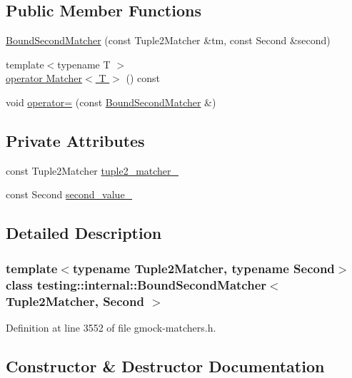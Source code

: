 \subsection*{Public Member Functions}
\begin{DoxyCompactItemize}
\item 
\hyperlink{classtesting_1_1internal_1_1BoundSecondMatcher_af9d0d4b50a3b9883ff26312922b9f639}{Bound\+Second\+Matcher} (const Tuple2\+Matcher \&tm, const Second \&second)
\item 
{\footnotesize template$<$typename T $>$ }\\\hyperlink{classtesting_1_1internal_1_1BoundSecondMatcher_abc5264ca86c2440b663036dcfb5403de}{operator Matcher$<$ T $>$} () const
\item 
void \hyperlink{classtesting_1_1internal_1_1BoundSecondMatcher_a62f714cb2c7388cb582aaae0110bfe49}{operator=} (const \hyperlink{classtesting_1_1internal_1_1BoundSecondMatcher}{Bound\+Second\+Matcher} \&)
\end{DoxyCompactItemize}
\subsection*{Private Attributes}
\begin{DoxyCompactItemize}
\item 
const Tuple2\+Matcher \hyperlink{classtesting_1_1internal_1_1BoundSecondMatcher_a4e73978cc5f6972a37b01832380f099e}{tuple2\+\_\+matcher\+\_\+}
\item 
const Second \hyperlink{classtesting_1_1internal_1_1BoundSecondMatcher_a5b0de81ac5ff6e7d9e21cb8bfeaacaf5}{second\+\_\+value\+\_\+}
\end{DoxyCompactItemize}


\subsection{Detailed Description}
\subsubsection*{template$<$typename Tuple2\+Matcher, typename Second$>$\newline
class testing\+::internal\+::\+Bound\+Second\+Matcher$<$ Tuple2\+Matcher, Second $>$}



Definition at line 3552 of file gmock-\/matchers.\+h.



\subsection{Constructor \& Destructor Documentation}
\mbox{\label{classtesting_1_1internal_1_1BoundSecondMatcher_af9d0d4b50a3b9883ff26312922b9f639}} 
